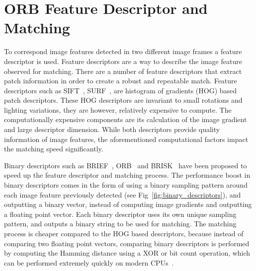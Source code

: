 %



\section{ORB Feature Descriptor and Matching}
\label{sec:orb}

To correspond image features detected in two different image frames a feature
descriptor is used. Feature descriptors are a way to describe the image feature
observed for matching. There are a number of feature descriptors that extract
patch information in order to create a robust and repeatable match. Feature
descriptors such as SIFT~\cite{Lowe1999}, SURF~\cite{Bay2006}, are histogram of
gradients (HOG) based patch descriptors. These HOG descriptors are invariant to
small rotations and lighting variations, they are however, relatively expensive
to compute. The computationally expensive components are its calculation of the
image gradient and large descriptor dimension. While both descriptors provide
quality information of image features, the aforementioned computational factors
impact the matching speed significantly.

Binary descriptors such as BRIEF~\cite{Calonder2010}, ORB~\cite{Rublee2011} and
BRISK~\cite{Leutenegger2011} have been proposed to speed up the feature
descriptor and matching process. The performance boost in binary descriptors
comes in the form of using a binary sampling pattern around each image feature
previously detected (see Fig~\ref{fig:binary_descriptors}), and outputting a
binary vector, instead of computing image gradients and outputting a floating
point vector. Each binary descriptor uses its own unique sampling pattern, and
outputs a binary string to be used for matching. The matching process is
cheaper compared to the HOG based descriptors, because instead of comparing two
floating point vectors, comparing binary descriptors is performed by computing
the Hamming distance using a XOR or bit count operation, which can be performed
extremely quickly on modern CPUs~\cite{Calonder2012}.

